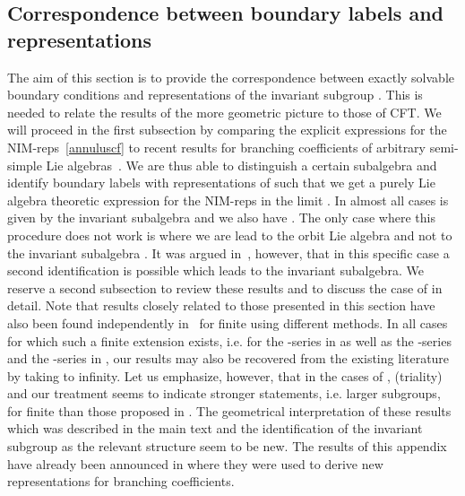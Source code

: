 \documentclass[12pt,a4paper]{article}
\providecommand{\mf}{\mathfrak} %
\def\iG{G^\omega} %
\def\sg{\mf{h}^\omega} %
\def\ig{\mf{g}^\omega} %
\begin{document}
\newpage
\begin{appendix}

\section{\label{sc:Correspondence}Correspondence between boundary 
labels and representations}

  The aim of this section is to provide the correspondence between exactly 
  solvable boundary conditions and representations of the invariant subgroup
  \myHighlight{$\iG$}\coordHE{}. This is needed to relate the results of the more geometric 
  picture to those of CFT. We will proceed in the first subsection by comparing
  the explicit expressions for the NIM-reps~\eqref{annuluscf} to recent results
  for branching coefficients of arbitrary semi-simple Lie
  algebras~\cite{Quella:2001wh}. We are thus able to distinguish a
  certain subalgebra \myHighlight{$\sg$}\coordHE{} and identify boundary labels with
  representations of \myHighlight{$\sg$}\coordHE{} such that we get a purely Lie algebra theoretic
  expression for the NIM-reps in the limit \coordHE{}. In almost all cases
  \myHighlight{$\sg$}\coordHE{} is given by the invariant subalgebra \myHighlight{$\ig$}\coordHE{} and we also have
  \myHighlight{$P_{\iG}^+=P_{\ig}^+$}\coordHE{}. The only case where this procedure does not work
  is \myHighlight{$\mf{g}=A_{2n}$}\coordHE{} where we are lead to the orbit Lie algebra \myHighlight{$\sg=C_n$}\coordHE{}
  and not to the invariant subalgebra \myHighlight{$\ig=B_n$}\coordHE{}.
  It was argued in~\cite{Quella:2001wh}, however, that in
  this specific case a second identification is possible which leads to the
  invariant subalgebra.
  We reserve a second subsection to review
  these results and to discuss the case of \coordHE{} in detail. Note that
  results closely related to those presented in this section have also been
  found independently in~\cite{Petkova:2002yj,Gaberdiel:2002qa} for finite \coordHE{}
  using different methods. In all cases for which such a finite \coordHE{} extension
  exists, i.e. for the \coordHE{}-series in \cite{Petkova:2002yj} as well as the
  \coordHE{}-series and the \coordHE{}-series
  in \cite{Gaberdiel:2002qa}, our results may also be recovered from the
  existing literature by taking \coordHE{} to infinity.
  Let us emphasize, however, that in the cases of \coordHE{},
  \coordHE{} (triality) and \coordHE{} our treatment seems to indicate stronger
  statements, i.e. larger subgroups, for finite \coordHE{} than those proposed
  in \cite{Gaberdiel:2002qa}. The geometrical
  interpretation of these results which was described in the main text and the
  identification of the invariant subgroup as the relevant structure seem to
  be new. The results of this appendix have already been announced in
  \cite{Quella:2001wh} where they were used to derive new
  representations for branching coefficients.


\end{appendix}
\end{document}

